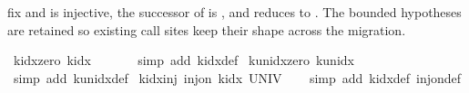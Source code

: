 \begin{isabellebody}
\begin{isamarkuptext}
  fix  and  is injective, the successor of
   is , and
   reduces to .
  The bounded hypotheses are retained so existing call sites keep their
  shape across the migration.%
\end{isamarkuptext}\isamarkuptrue%
\isamarkupfalse%
\ k{\isacharunderscore}{\kern0pt}idx{\isacharunderscore}{\kern0pt}zero{\isacharcolon}{\kern0pt}\ {\isachardoublequoteopen}k{\isacharunderscore}{\kern0pt}idx\ {}\ {\isacharequal}{\kern0pt}\ {}{\isachardoublequoteclose}\isanewline
%
\isadelimproof
\ \ %
\endisadelimproof
%
\isatagproof
{}\isamarkupfalse%
\ {\isacharparenleft}{\kern0pt}simp\ add{\isacharcolon}{\kern0pt}\ k{\isacharunderscore}{\kern0pt}idx{\isacharunderscore}{\kern0pt}def{\isacharparenright}{\kern0pt}%
\endisatagproof
{\isafoldproof}%
%
\isadelimproof
\isanewline
%
\endisadelimproof
\isanewline
{}\isamarkupfalse%
\ k{\isacharunderscore}{\kern0pt}unidx{\isacharunderscore}{\kern0pt}zero{\isacharcolon}{\kern0pt}\ {\isachardoublequoteopen}k{\isacharunderscore}{\kern0pt}unidx\ {}\ {\isacharequal}{\kern0pt}\ {}{\isachardoublequoteclose}\isanewline
%
\isadelimproof
\ \ %
\endisadelimproof
%
\isatagproof
{}\isamarkupfalse%
\ {\isacharparenleft}{\kern0pt}simp\ add{\isacharcolon}{\kern0pt}\ k{\isacharunderscore}{\kern0pt}unidx{\isacharunderscore}{\kern0pt}def{\isacharparenright}{\kern0pt}%
\endisatagproof
{\isafoldproof}%
%
\isadelimproof
\isanewline
%
\endisadelimproof
\isanewline
{}\isamarkupfalse%
\ k{\isacharunderscore}{\kern0pt}idx{\isacharunderscore}{\kern0pt}inj{\isacharcolon}{\kern0pt}\ {\isachardoublequoteopen}inj{\isacharunderscore}{\kern0pt}on\ k{\isacharunderscore}{\kern0pt}idx\ UNIV{\isachardoublequoteclose}\isanewline
%
\isadelimproof
\ \ %
\endisadelimproof
%
\isatagproof
{}\isamarkupfalse%
\ {\isacharparenleft}{\kern0pt}simp\ add{\isacharcolon}{\kern0pt}\ k{\isacharunderscore}{\kern0pt}idx{\isacharunderscore}{\kern0pt}def\ inj{\isacharunderscore}{\kern0pt}on{\isacharunderscore}{\kern0pt}def{\isacharparenright}{\kern0pt}%

\end{isabellebody}
